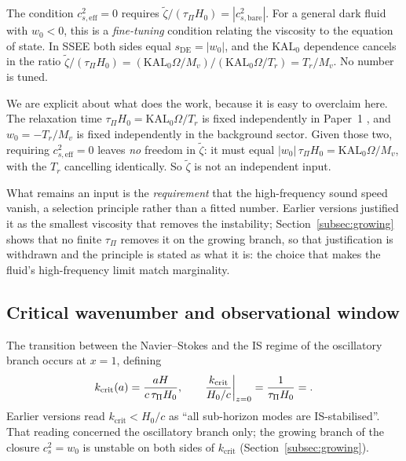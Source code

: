 \documentclass[12pt,a4paper]{article}
\newcommand{\KALz}{\mathrm{KAL}_0}
\newcommand{\wz}{w_0}
\newcommand{\sDE}{s_{\mathrm{DE}}}
\newcommand{\tauPi}{\tau_\Pi}
\newcommand{\ztilde}{\tilde{\zeta}}
\begin{document}
The condition $c^2_{s,\mathrm{eff}} = 0$ requires $\ztilde/(\tauPi H_0) = |c^2_{s,\mathrm{bare}}|$.
For a general dark fluid with $w_0 < 0$, this is a \emph{fine-tuning} condition
relating the viscosity to the equation of state.
In SSEE both sides equal $\sDE = |\wz|$, and the $\KALz$ dependence cancels
in the ratio $\ztilde/(\tauPi H_0) = (\KALz\Omega/M_v)/(\KALz\Omega/T_r) = T_r/M_v$.
No number is tuned.

We are explicit about what does the work, because it is easy to overclaim here.
The relaxation time $\tauPi H_0 = \KALz\Omega/T_r$ is fixed independently in
Paper~1 \citep{SSEE_Paper1}, and $\wz = -T_r/M_v$ is fixed independently in the
background sector. Given those two, requiring $c^2_{s,\mathrm{eff}}=0$ leaves
\emph{no} freedom in $\ztilde$: it must equal $|\wz|\,\tauPi H_0
= \KALz\Omega/M_v$, with the $T_r$ cancelling identically. So $\ztilde$ is not
an independent input.

What remains an input is the \emph{requirement} that the high-frequency sound
speed vanish, a selection principle rather than a fitted number. Earlier versions
justified it as the smallest viscosity that removes the instability;
Section~\ref{subsec:growing} shows that no finite $\tauPi$ removes it on the growing
branch, so that justification is withdrawn and the principle is stated as what it
is: the choice that makes the fluid's high-frequency limit match marginality.

\subsection{Critical wavenumber and observational window}
\label{subsec:kcrit}

The transition between the Navier--Stokes and the IS regime of the oscillatory
branch occurs at $x = 1$, defining
\begin{equation}
  k_\mathrm{crit}(a) = \frac{aH}{c\,\tauPi H_0},
  \qquad
  \frac{k_\mathrm{crit}}{H_0/c}\bigg|_{z=0} = \frac{1}{\tauPi H_0} = \val{kcrit_p5}.
  \label{eq:kcrit_z0}
\end{equation}
Earlier versions read $k_\mathrm{crit}<H_0/c$ as ``all sub-horizon modes are
IS-stabilised''. That reading concerned the oscillatory branch only; the growing
branch of the closure $c^2_s=\wz$ is unstable on both sides of $k_\mathrm{crit}$
(Section~\ref{subsec:growing}).
\end{document}
